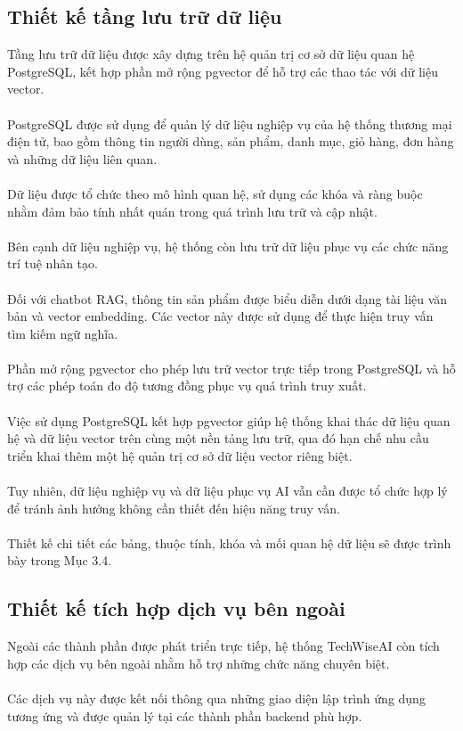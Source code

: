 \documentclass{report}
\begin{document}
\subsection{Thiết kế tầng lưu trữ dữ liệu}
Tầng lưu trữ dữ liệu được xây dựng trên
hệ quản trị cơ sở dữ liệu quan hệ
PostgreSQL, kết hợp phần mở rộng pgvector
để hỗ trợ các thao tác với dữ liệu vector.\\\\
PostgreSQL được sử dụng để quản lý dữ
liệu nghiệp vụ của hệ thống thương mại
điện tử, bao gồm thông tin người dùng,
sản phẩm, danh mục, giỏ hàng, đơn hàng
và những dữ liệu liên quan.\\\\
Dữ liệu được tổ chức theo mô hình quan
hệ, sử dụng các khóa và ràng buộc nhằm
đảm bảo tính nhất quán trong quá trình
lưu trữ và cập nhật.\\\\
Bên cạnh dữ liệu nghiệp vụ, hệ thống
còn lưu trữ dữ liệu phục vụ các chức
năng trí tuệ nhân tạo.\\\\
Đối với chatbot RAG, thông tin sản phẩm
được biểu diễn dưới dạng tài liệu văn
bản và vector embedding. Các vector
này được sử dụng để thực hiện truy
vấn tìm kiếm ngữ nghĩa.\\\\
Phần mở rộng pgvector cho phép lưu trữ
vector trực tiếp trong PostgreSQL và
hỗ trợ các phép toán đo độ tương đồng
phục vụ quá trình truy xuất.\\\\
Việc sử dụng PostgreSQL kết hợp pgvector
giúp hệ thống khai thác dữ liệu quan
hệ và dữ liệu vector trên cùng một
nền tảng lưu trữ, qua đó hạn chế
nhu cầu triển khai thêm một hệ quản
trị cơ sở dữ liệu vector riêng biệt.\\\\
Tuy nhiên, dữ liệu nghiệp vụ và dữ
liệu phục vụ AI vẫn cần được tổ chức
hợp lý để tránh ảnh hưởng không cần
thiết đến hiệu năng truy vấn.\\\\
Thiết kế chi tiết các bảng, thuộc
tính, khóa và mối quan hệ dữ liệu
sẽ được trình bày trong Mục 3.4.

\subsection{Thiết kế tích hợp dịch vụ bên ngoài}
Ngoài các thành phần được phát triển
trực tiếp, hệ thống TechWiseAI còn
tích hợp các dịch vụ bên ngoài nhằm
hỗ trợ những chức năng chuyên biệt.\\\\
Các dịch vụ này được kết nối thông
qua những giao diện lập trình ứng
dụng tương ứng và được quản lý tại
các thành phần backend phù hợp.
\end{document}
